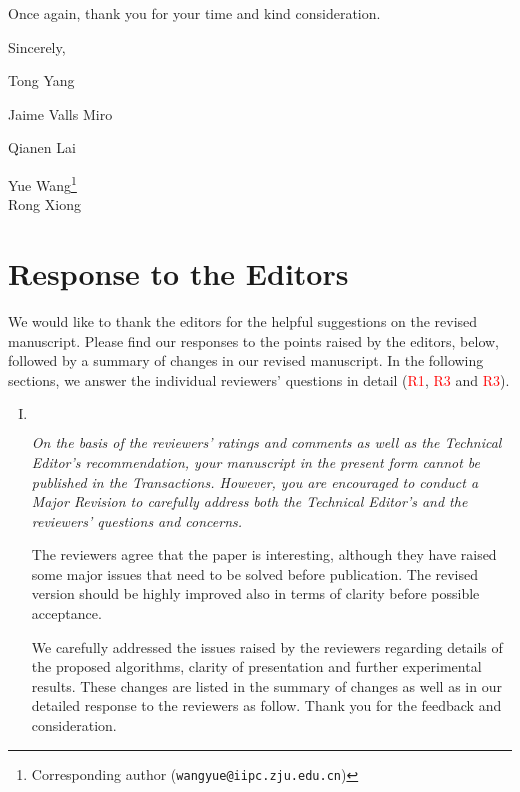 \documentclass[11pt]{article}
\newenvironment{reviewer}
{\begin{mdframed}[roundcorner = 10pt,fontcolor=blue!70!black]\itshape}
{\end{mdframed}}
\begin{document}
\par \bigskip Once again, thank you for your time and kind consideration. 

\bigskip
Sincerely,
\par \bigskip
Tong Yang \par 
Jaime Valls Miro \par
Qianen Lai \par 
Yue Wang\footnote{Corresponding author (\texttt{wangyue@iipc.zju.edu.cn})}\\
Rong Xiong \\

\clearpage

\section*{Response to the Editors}
We would like to thank the editors for the helpful suggestions on the revised manuscript. Please find our responses to the points raised by the editors, below, followed by a summary of changes in our revised manuscript. In the following sections, we answer the individual reviewers' questions in detail (\textcolor{red}{R1}, \textcolor{red}{R3} and \textcolor{red}{R3}).

\begin{enumerate}[I.]
 \item $ $
  \begin{reviewer}
  On the basis of the reviewers' ratings and comments as well as the Technical Editor's recommendation, your manuscript in the present form cannot be published in the Transactions. However, you are encouraged to conduct a Major Revision to carefully address both the Technical Editor’s and the reviewers' questions and concerns.
  
  The reviewers agree that the paper is interesting, although they have raised some major issues that need to be solved before publication. The revised version should be highly improved also in terms of clarity before possible acceptance.
  \end{reviewer}
  \noindent
  We carefully addressed the issues raised by the reviewers regarding details of the proposed algorithms, clarity of presentation  and further experimental results. These changes are listed in the summary of changes as well as in our detailed response to the reviewers as follow. Thank you for the feedback and consideration.
\end{enumerate}
\end{document}
